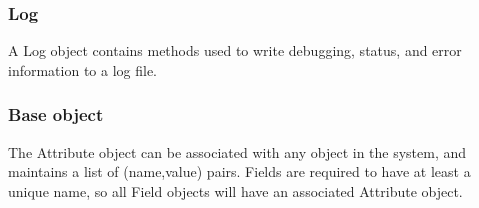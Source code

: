 \subsubsection{Log}

A Log object contains methods used to write debugging, status,
and error information to a log file.

\subsubsection{Base object}

The Attribute object can be associated with any object in the system,
and maintains a list of (name,value) pairs.  Fields are required to
have at least a unique name, so all Field objects will have an associated
Attribute object.

